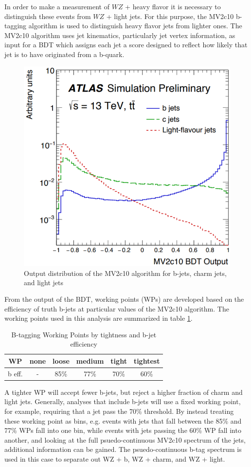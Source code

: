 \documentclass[NOTE, atlasdraft=true, texlive=2016, UKenglish]{\ATLASLATEXPATH atlasdoc}
\begin{document}
In order to make a measurement of $WZ$ + heavy flavor it is necessary to distinguish these events from $WZ$ + light jets. For this purpose, the MV2c10 b-tagging algorithm is used to distinguish heavy flavor jets from lighter ones. The MV2c10 algorithm uses jet kinematics, particularly jet vertex information, as input for a BDT which assigns each jet a score designed to reflect how likely that jet is to have originated from a b-quark. 

\begin{figure}[H]
    \centering
    \includegraphics[width=0.54\linewidth]{MV2c10_output.png}
    \caption{Output distribution of the MV2c10 algorithm for b-jets, charm jets, and light jets}
    \label{fig:MV2c10}
\end{figure}

From the output of the BDT, working points (WPs) are developed based on the efficiency of truth b-jets at particular values of the MV2c10 algorithm. The working points used in this analysis are summarized in table \ref{tab:btag_WPs}. 

\begin{table}[H]
\begin{center}
\begin{tabular}{|c|ccccc|}
    \hline
       WP &  none & loose & medium & tight & tightest\\
       \hline
     b eff. & - & 85\% & 77\% & 70\% & 60\% \\ 
    \hline
    \end{tabular}    
    \caption{B-tagging Working Points by tightness and b-jet efficiency}
    \label{tab:btag_WPs}
    \end{center}
\end{table}

A tighter WP will accept fewer b-jets, but reject a higher fraction of charm and light jets. Generally, analyses that include b-jets will use a fixed working point, for example, requiring that a jet pass the 70\% threshold. By instead treating these working point as bins, e.g. events with jets that fall between the 85\% and 77\% WPs fall into one bin, while events with jets passing the 60\% WP fall into another, and looking at the full psuedo-continuous MV2c10 spectrum of the jets, additional information can be gained. The psuedo-continuous b-tag spectrum is used in this case to separate out WZ + b, WZ + charm, and WZ + light. 
\end{document}
